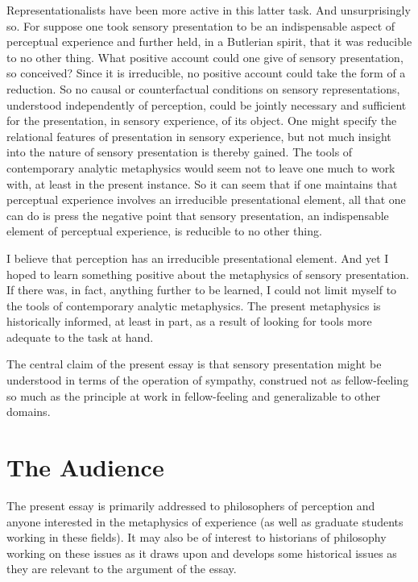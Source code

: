 \documentclass[12pt]{article}
\begin{document}
Representationalists have been more active in this latter task. And unsurprisingly so. For suppose one took sensory presentation to be an indispensable aspect of perceptual experience and further held, in a Butlerian spirit, that it was reducible to no other thing. What positive account could one give of sensory presentation, so conceived? Since it is irreducible, no positive account could take the form of a reduction. So no causal or counterfactual conditions on sensory representations, understood independently of perception, could be jointly necessary and sufficient for the presentation, in sensory experience, of its object. One might specify the
relational features of presentation in sensory experience, but not much insight into the nature of sensory presentation is thereby gained. The tools of contemporary analytic metaphysics would seem not to leave one much to work with, at least in the present instance. So it can seem that if one maintains that perceptual experience involves an irreducible presentational element, all that one can do is press the negative point that sensory presentation, an indispensable element of perceptual experience, is reducible to no other thing.

I believe that perception has an irreducible presentational element. And yet I hoped to learn something positive about the metaphysics of sensory presentation. If there was, in fact, anything further to be learned, I could not limit myself to the tools of contemporary analytic metaphysics. The present metaphysics is historically informed, at least in part, as a result of looking for tools more adequate to the task at hand. 

The central claim of the present essay is that sensory presentation might be understood in terms of the operation of sympathy, construed not as fellow-feeling so much as the principle at work in fellow-feeling and generalizable to other domains.

\section{The Audience} %
\label{sec:the_audience}

The present essay is primarily addressed to philosophers of perception and anyone interested in the metaphysics of experience (as well as graduate students working in these fields). It may also be of interest to historians of philosophy working on these issues as it draws upon and develops some historical issues as they are relevant to the argument of the essay.
\end{document}
